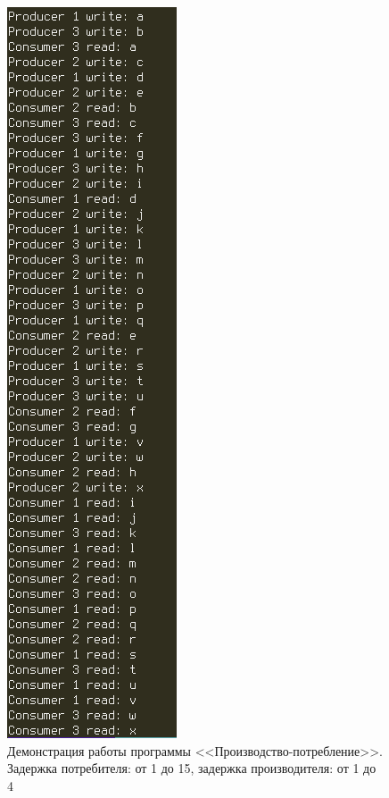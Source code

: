 \documentclass[12pt]{report}
\begin{document}
\begin{figure}[H]
	\centering
	\includegraphics[scale=0.75]{img/prod-cons-04.png}
	\caption{Демонстрация работы программы <<Производство-потребление>>. Задержка потребителя: от 1 до 15, задержка производителя: от 1 до 4}
	\label{fig:task01-04}
\end{figure}
\end{document}
